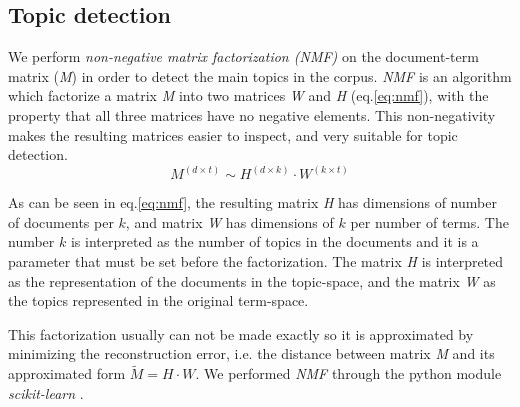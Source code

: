 \subsection{Topic detection}
\par We perform \emph{non-negative matrix factorization (NMF)} on the document-term matrix (\emph{M}) in order to detect the main topics in the corpus. 
\emph{NMF} is an algorithm which factorize a matrix \emph{M} into two matrices \emph{W} and \emph{H} (eq.\ref{eq:nmf}), with the property that all three matrices have no negative elements. This non-negativity makes the resulting matrices easier to inspect, and very suitable for topic detection.
\begin{equation}
M^{(d \times t)} \sim H^{(d \times k)} \cdot W^{(k \times t)}
\label{eq:nmf}
\end{equation}
\par As can be seen in eq.\ref{eq:nmf}, the resulting matrix \emph{H} has dimensions of number of documents per $k$, and matrix \emph{W} has dimensions of $k$ per number of terms. The number $k$ is interpreted as the number of topics in the documents and it is a parameter that must be set before the factorization.
The matrix \emph{H} is interpreted as the representation of the documents in the topic-space, and the matrix \emph{W} as the topics represented in the original term-space. 
\par This factorization usually can not be made exactly so it is approximated by minimizing the reconstruction error, i.e. the distance between matrix \emph{M} and its approximated form $\tilde{M} = H \cdot W$. We performed \emph{NMF} through the python module \emph{scikit-learn} \cite{scikit-learn}. %

